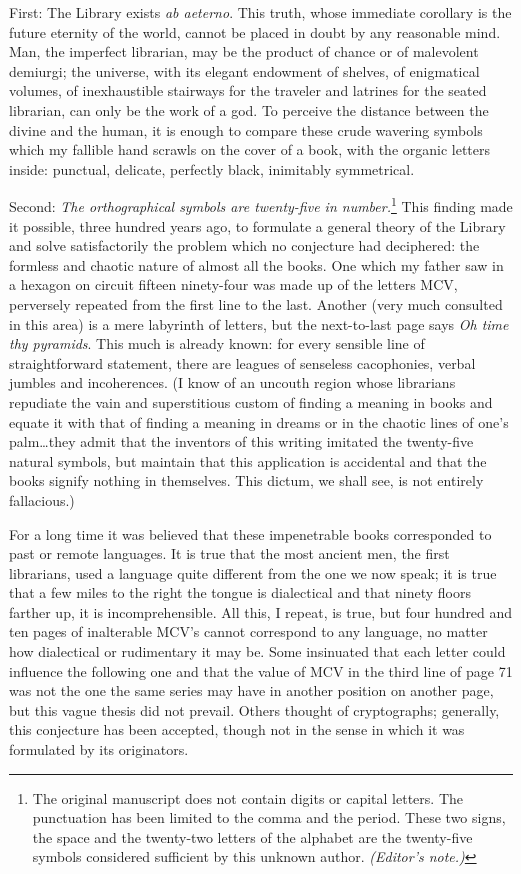 \documentclass[oneside]{book}
\begin{document}
First: The Library exists \emph{ab aeterno}. This truth, whose immediate corollary is the future eternity of the world, cannot be placed in doubt by any reasonable mind. Man, the imperfect librarian, may be the product of chance or of malevolent demiurgi; the universe, with its elegant endowment of shelves, of enigmatical volumes, of inexhaustible stairways for the traveler and latrines for the seated librarian, can only be the work of a god. To perceive the distance between the divine and the human, it is enough to compare these crude wavering symbols which my fallible hand scrawls on the cover of a book, with the organic letters inside: punctual, delicate, perfectly black, inimitably symmetrical.

Second: \emph{The orthographical symbols are twenty-five in number.}\footnote{The original manuscript does not contain digits or capital letters. The punctuation has been limited to the comma and the period. These two signs, the space and the twenty-two letters of the alphabet are the twenty-five symbols considered sufficient by this unknown author. \emph{(Editor's note.)}} This finding made it possible, three hundred years ago, to formulate a general theory of the Library and solve satisfactorily the problem which no conjecture had deciphered: the formless and chaotic nature of almost all the books. One which my father saw in a hexagon on circuit fifteen ninety-four was made up of the letters MCV, perversely repeated from the first line to the last. Another (very much consulted in this area) is a mere labyrinth of letters, but the next-to-last page says \emph{Oh time thy pyramids}. This much is already known: for every sensible line of straightforward statement, there are leagues of senseless cacophonies, verbal jumbles and incoherences. (I know of an uncouth region whose librarians repudiate the vain and superstitious custom of finding a meaning in books and equate it with that of finding a meaning in dreams or in the chaotic lines of one's palm\dots they admit that the inventors of this writing imitated the twenty-five natural symbols, but maintain that this application is accidental and that the books signify nothing in themselves. This dictum, we shall see, is not entirely fallacious.)

For a long time it was believed that these impenetrable books corresponded to past or remote languages. It is true that the most ancient men, the first librarians, used a language quite different from the one we now speak; it is true that a few miles to the right the tongue is dialectical and that ninety floors farther up, it is incomprehensible. All this, I repeat, is true, but four hundred and ten pages of inalterable MCV's cannot correspond to any language, no matter how dialectical or rudimentary it may be. Some insinuated that each letter could influence the following one and that the value of MCV in the third line of page 71 was not the one the same series may have in another position on another page, but this vague thesis did not prevail. Others thought of cryptographs; generally, this conjecture has been accepted, though not in the sense in which it was formulated by its originators.
\end{document}
